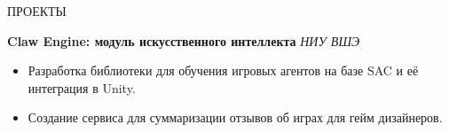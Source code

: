 \documentclass{resume}
\begin{document}
\begin{rSection}{ПРОЕКТЫ}

\textbf{Claw Engine: модуль искусственного интеллекта}  
\textit{НИУ ВШЭ}  
\begin{itemize}
    \itemsep -3pt {} 
    \item Разработка библиотеки для обучения игровых агентов на базе SAC и её интеграция в Unity.
    \item Создание сервиса для суммаризации отзывов об играх для гейм дизайнеров.
\end{itemize}

\end{rSection}
\end{document}

